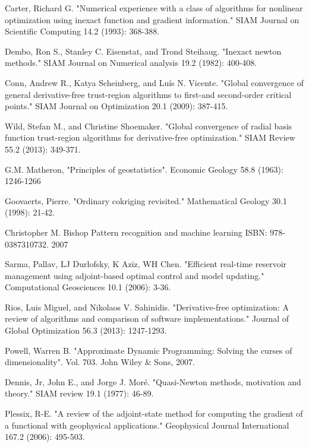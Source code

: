 \documentclass[a4paper,onecolumn]{article}
\theoremstyle{remark}
\begin{document}
\begin{thebibliography}{9}
Carter, Richard G. 
"Numerical experience with a class of algorithms for nonlinear optimization using inexact function and gradient information." 
SIAM Journal on Scientific Computing 14.2 (1993): 368-388.

Dembo, Ron S., Stanley C. Eisenstat, and Trond Steihaug. 
"Inexact newton methods." 
SIAM Journal on Numerical analysis 19.2 (1982): 400-408.

Conn, Andrew R., Katya Scheinberg, and Luís N. Vicente. 
"Global convergence of general derivative-free trust-region algorithms to first-and second-order critical points." 
SIAM Journal on Optimization 20.1 (2009): 387-415.

Wild, Stefan M., and Christine Shoemaker. 
"Global convergence of radial basis function trust-region algorithms for derivative-free optimization." 
SIAM Review 55.2 (2013): 349-371.

G.M. Matheron,
"Principles of geostatistics".
Economic Geology 58.8 (1963): 1246-1266

Goovaerts, Pierre. 
"Ordinary cokriging revisited." 
Mathematical Geology 30.1 (1998): 21-42.

Christopher M. Bishop
Pattern recognition and machine learning
ISBN: 978-0387310732. 2007

Sarma, Pallav, LJ Durlofsky, K Aziz, WH Chen. 
"Efficient real-time reservoir management using adjoint-based optimal control and model updating." 
Computational Geosciences 10.1 (2006): 3-36.

Rios, Luis Miguel, and Nikolaos V. Sahinidis. 
"Derivative-free optimization: A review of algorithms and comparison of software implementations." 
Journal of Global Optimization 56.3 (2013): 1247-1293.

Powell, Warren B.
"Approximate Dynamic Programming: Solving the curses of dimensionality".
Vol. 703. John Wiley \& Sons, 2007.

Dennis, Jr, John E., and Jorge J. Moré. 
"Quasi-Newton methods, motivation and theory." 
SIAM review 19.1 (1977): 46-89.

Plessix, R-E. 
"A review of the adjoint-state method for computing the gradient of a functional with geophysical applications." 
Geophysical Journal International 167.2 (2006): 495-503.


\end{thebibliography}
\end{document}
